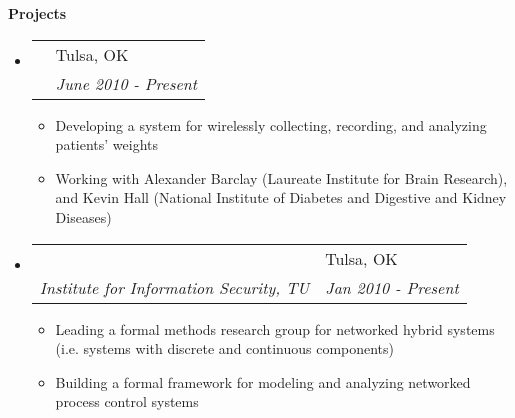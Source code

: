 \documentclass[letterpaper,11pt]{article}
\makeatletter
\newcommand{\resitem}[1]{\item \parbox[t]{4.6in}{#1} \vspace{-2pt}}
\newcommand{\resheading}[1]{{\large \colorbox{mygrey}{\begin{minipage}{\textwidth}{\textbf{#1 \vphantom{p\^{E}}}}\end{minipage}}}}
\newcommand{\ressubheading}[4]{
\begin{tabular*}{6.5in}[t]{l@{\extracolsep{\fill}}l}
		\textbf{\parbox[t]{4.5in}{\raggedright #1 }} & \parbox[b]{1.5in}{#2} \\
		\textit{#3} & \textit{#4} \\
\end{tabular*}\vspace{-6pt}}
\makeatother
\begin{document}
\resheading{Projects}

\begin{itemize}
\item
	\ressubheading{GSM Scale}{Tulsa, OK}{}{June 2010 - Present}
	\begin{itemize}
		\resitem{Developing a system for wirelessly collecting, recording, and analyzing patients' weights}
		\resitem{Working with Alexander Barclay (Laureate Institute for Brain Research), and Kevin Hall (National Institute of Diabetes and Digestive and Kidney Diseases)}
	\end{itemize}

\item
	\ressubheading{Cyber-physical Systems}{Tulsa, OK}{Institute for Information Security, TU}{Jan 2010 - Present}
	\begin{itemize}
		\resitem{Leading a formal methods research group for networked hybrid systems (i.e. systems with discrete and continuous components)}
		\resitem{Building a formal framework for modeling and analyzing networked process control systems}
	\end{itemize}




\end{itemize}
\end{document}
